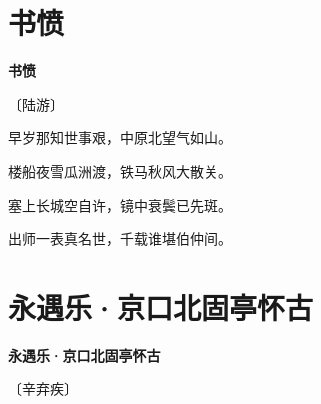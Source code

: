 \documentclass[12pt,UTF-8,openany,fontset=none]{ctexbook}
\begin{document}
\vspace{8pt}
\clearpage

\section{书愤}


\begin{center}
    {\bfseries 书愤}

    \vspace{18pt}

    \begin{large}\xuwen
        〔陆游〕
    \end{large}

\end{center}

    \vspace{18pt}  %

\begin{center}
    \begin{Large}

        早岁那知世事艰，中原北望气如山。

        楼船夜雪瓜洲渡，铁马秋风大散关。

        塞上长城空自许，镜中衰鬓已先斑。

        出师一表真名世，千载谁堪伯仲间。

    \end{Large}

\end{center}

\vspace{8pt}
\clearpage

\section{永遇乐·京口北固亭怀古}


\begin{center}
    {\bfseries 永遇乐·京口北固亭怀古}

    \vspace{18pt}

    \begin{large}\xuwen
        〔辛弃疾〕
    \end{large}

\end{center}

    \vspace{18pt}  %
\end{document}
